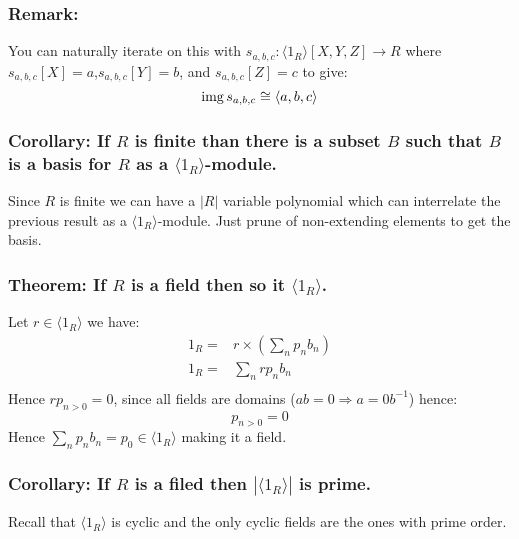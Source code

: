 \subsubsection{Remark:}
You can naturally iterate on this with $s_{a,b,c}: \langle 1_R \rangle[X,Y,Z] \rightarrow R$ where $s_{a,b,c}[X] = a$,$s_{a,b,c}[Y] = b$, and $s_{a,b,c}[Z] = c$ to give:
\[\operatorname{img} s_{a,b,c} \cong \langle a,b,c \rangle\]

\subsubsection{Corollary: If $R$ is finite than there is a subset $B$ such that $B$ is a basis for $R$ as a $\langle 1_R \rangle$-module.}
Since $R$ is finite we can have a $|R|$ variable polynomial which can interrelate the previous result as a $\langle 1_R \rangle$-module.
Just prune of non-extending elements to get the basis.

\subsubsection{Theorem: If $R$ is a field then so it $\langle 1_R \rangle$.}
Let $r\in\langle 1_R \rangle$ we have:
\begin{equation*}
\begin{aligned}
	1_R =& r\times\left(\sum_np_nb_n\right)\\
	1_R =& \sum_nrp_nb_n\\
\end{aligned}
\end{equation*}
Hence $rp_{n>0} = 0$, 
since all fields are domains ($ab=0\Rightarrow a=0b^{-1}$) hence:
\[p_{n>0} = 0\]
Hence $\sum_np_nb_n = p_0 \in \langle 1_R \rangle$ making it a field.

\subsubsection{Corollary: If $R$ is a filed then $|\langle 1_R \rangle|$ is prime.}
Recall that $\langle 1_R \rangle$ is cyclic and the only cyclic fields are the ones with prime order.
